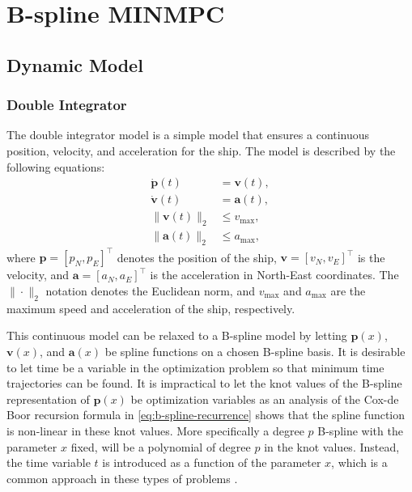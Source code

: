 
\chapter{B-spline MINMPC}\label{chap:b-spline-minmpc}

\section{Dynamic Model}
\subsection{Double Integrator}
The double integrator model is a simple model that ensures a continuous position, velocity, and acceleration for the ship. The model is described by the following equations:
\begin{subequations}\label{eq:double-integrator}
    \begin{align}
        \dot{\mathbf{p}}(t) &= \mathbf{v}(t), \label{eq:double-integrator-x} \\
        \dot{\mathbf{v}}(t) &= \mathbf{a}(t), \label{eq:double-integrator-v} \\
        \|\mathbf{v}(t)\|_2 &\leq v_{\max}, \label{eq:double-integrator-vmax} \\
        \|\mathbf{a}(t)\|_2 &\leq a_{\max}, \label{eq:double-integrator-a}
    \end{align}
\end{subequations}
where $\mathbf{p} = [p_N, p_E]^\top$ denotes the position of the ship, $\mathbf{v} = [v_N, v_E]^\top$ is the velocity, and $\mathbf{a} = [a_N, a_E]^\top$ is the acceleration in North-East coordinates. The $\|\cdot\|_2$ notation denotes the Euclidean norm, and $v_{\max}$ and $a_{\max}$ are the maximum speed and acceleration of the ship, respectively.

This continuous model can be relaxed to a B-spline model by letting $\mathbf{p}(x)$, $\mathbf{v}(x)$, and $\mathbf{a}(x)$ be spline functions on a chosen B-spline basis. It is desirable to let time be a variable in the optimization problem so that minimum time trajectories can be found. It is impractical to let the knot values of the B-spline representation of $\mathbf{p}(x)$ be optimization variables as an analysis of the Cox-de Boor recursion formula in \cref{eq:b-spline-recurrence} shows that the spline function is non-linear in these knot values. More specifically a degree $p$ B-spline with the parameter $x$ fixed, will be a polynomial of degree $p$ in the knot values. Instead, the time variable $t$ is introduced as a function of the parameter $x$, which is a common approach in these types of problems \citep{mercy2017spline,ShortestPathsConvexSets}. 

